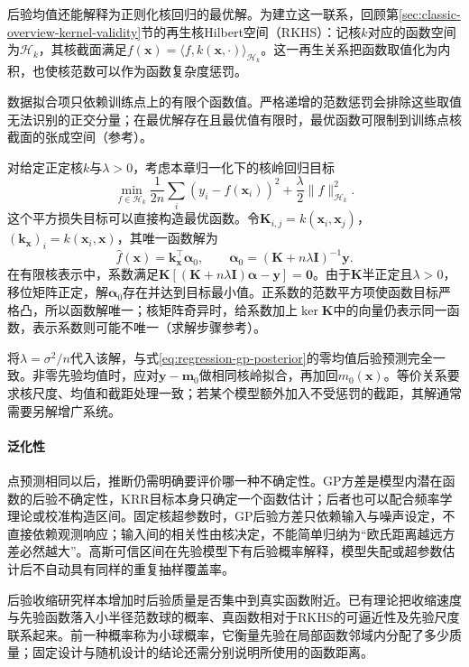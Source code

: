 后验均值还能解释为正则化核回归的最优解。为建立这一联系，回顾第\ref{sec:classic-overview-kernel-validity}节的再生核Hilbert空间（RKHS）：记核$k$对应的函数空间为$\mathcal H_k$，其核截面满足$f(\bm{x})=\langle f,k(\bm{x},\cdot)\rangle_{\mathcal H_k}$。这一再生关系把函数取值化为内积，也使核范数可以作为函数复杂度惩罚。

数据拟合项只依赖训练点上的有限个函数值。严格递增的范数惩罚会排除这些取值无法识别的正交分量；在最优解存在且最优值有限时，最优函数可限制到训练点核截面的张成空间（参考）。

对给定正定核$k$与$\lambda>0$，考虑本章归一化下的核岭回归目标
\[
 \min_{f\in\mathcal H_k}
 \frac1{2n}\sum_i(y_i-f(\bm x_i))^2
 +\frac{\lambda}{2}\lVert f\rVert_{\mathcal H_k}^2.
\]
这个平方损失目标可以直接构造最优函数。令$\bm K_{i,j}=k(\bm x_i,\bm x_j)$，$(\bm k_{\bm x})_i=k(\bm x_i,\bm x)$，其唯一函数解为
\[
 \widehat f(\bm x)=\bm k_{\bm x}^\top\bm\alpha_0,\qquad
 \bm\alpha_0=(\bm K+n\lambda\bm I)^{-1}\bm y.
\]
在有限核表示中，系数满足$\bm K[(\bm K+n\lambda\bm I)\bm\alpha-\bm y]=\bm0$。由于$\bm K$半正定且$\lambda>0$，移位矩阵正定，解$\bm\alpha_0$存在并达到目标最小值。正系数的范数平方项使函数目标严格凸，所以函数解唯一；核矩阵奇异时，给系数加上$\ker\bm K$中的向量仍表示同一函数，表示系数则可能不唯一（求解步骤参考）。

将$\lambda=\sigma^2/n$代入该解，与式\eqref{eq:regression-gp-posterior}的零均值后验预测完全一致。非零先验均值时，应对$\bm{y}-\bm{m}_0$做相同核岭拟合，再加回$m_0(\bm{x})$。等价关系要求核尺度、均值和截距处理一致；若某个模型额外加入不受惩罚的截距，其解通常需要另解增广系统。

\paragraph{泛化性}
点预测相同以后，推断仍需明确要评价哪一种不确定性。GP方差是模型内潜在函数的后验不确定性，KRR目标本身只确定一个函数估计；后者也可以配合频率学理论或校准构造区间。固定核超参数时，GP后验方差只依赖输入与噪声设定，不直接依赖观测响应；输入间的相关性由核决定，不能简单归纳为“欧氏距离越远方差必然越大”。高斯可信区间在先验模型下有后验概率解释，模型失配或超参数估计后不自动具有同样的重复抽样覆盖率。

后验收缩研究样本增加时后验质量是否集中到真实函数附近。已有理论把收缩速度与先验函数落入小半径范数球的概率、真函数相对于RKHS的可逼近性及先验尺度联系起来。前一种概率称为小球概率，它衡量先验在局部函数邻域内分配了多少质量；固定设计与随机设计的结论还需分别说明所使用的函数距离。

